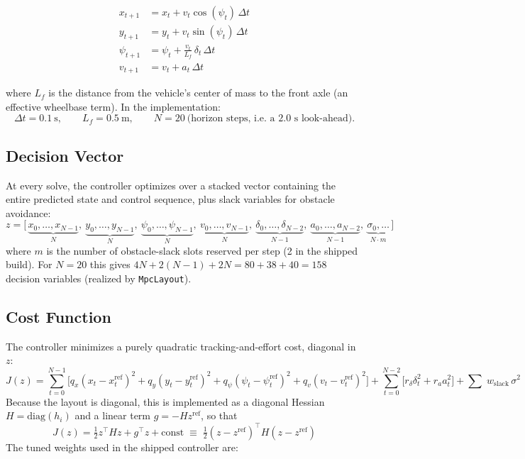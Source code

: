 ﻿\documentclass[11pt,a4paper]{article}
\begin{document}
\begin{align}
x_{t+1}   &= x_t + v_t \cos(\psi_t)\,\Delta t \\
y_{t+1}   &= y_t + v_t \sin(\psi_t)\,\Delta t \\
\psi_{t+1}&= \psi_t + \frac{v_t}{L_f}\,\delta_t\,\Delta t \\
v_{t+1}   &= v_t + a_t\,\Delta t
\end{align}

where $L_f$ is the distance from the vehicle's center of mass to the front axle (an effective wheelbase term). In the implementation:
\[
\Delta t = 0.1\ \text{s}, \qquad L_f = 0.5\ \text{m}, \qquad N = 20 \ \text{(horizon steps, i.e.\ a 2.0 s look-ahead)}.
\]

\subsection{Decision Vector}
At every solve, the controller optimizes over a stacked vector containing the entire predicted state and control sequence, plus slack variables for obstacle avoidance:
\[
z = \big[\, \underbrace{x_0,\dots,x_{N-1}}_{N},\ \underbrace{y_0,\dots,y_{N-1}}_{N},\ \underbrace{\psi_0,\dots,\psi_{N-1}}_{N},\ \underbrace{v_0,\dots,v_{N-1}}_{N},\ \underbrace{\delta_0,\dots,\delta_{N-2}}_{N-1},\ \underbrace{a_0,\dots,a_{N-2}}_{N-1},\ \underbrace{\sigma_{0},\dots}_{N \cdot m}\, \big]
\]
where $m$ is the number of obstacle-slack slots reserved per step (2 in the shipped build). For $N=20$ this gives $4N + 2(N-1) + 2N = 80+38+40 = 158$ decision variables (realized by \texttt{MpcLayout}).

\subsection{Cost Function}
The controller minimizes a purely quadratic tracking-and-effort cost, diagonal in $z$:
\begin{equation}
J(z) = \sum_{t=0}^{N-1}\Big[
q_x (x_t - x_t^{\text{ref}})^2 + q_y (y_t - y_t^{\text{ref}})^2 + q_\psi (\psi_t - \psi_t^{\text{ref}})^2 + q_v (v_t - v_t^{\text{ref}})^2
\Big]
+\sum_{t=0}^{N-2}\Big[ r_\delta \delta_t^2 + r_a a_t^2 \Big] + \sum \; w_{\text{slack}}\,\sigma^2
\end{equation}
Because the layout is diagonal, this is implemented as a diagonal Hessian $H = \mathrm{diag}(h_i)$ and a linear term $g = -H z^{\text{ref}}$, so that
\begin{equation}
J(z) = \tfrac{1}{2} z^\top H z + g^\top z + \text{const} \;\equiv\; \tfrac{1}{2}(z - z^{\text{ref}})^\top H (z - z^{\text{ref}})
\end{equation}
The tuned weights used in the shipped controller are:
\end{document}
